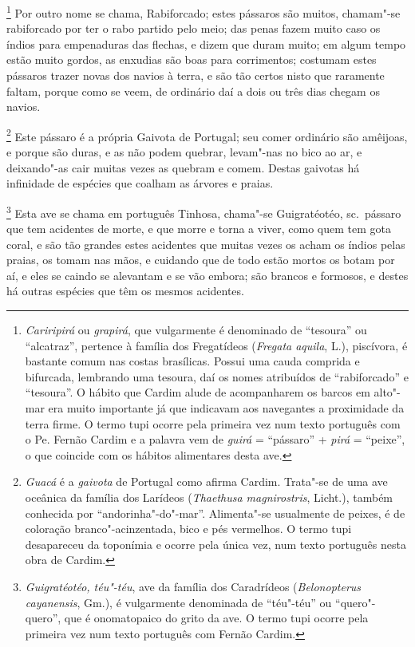 \begin{linenumbers}
\footnote{ \textit{Cariripirá} ou \textit{grapirá}, 
que vulgarmente é denominado de ``tesoura'' ou ``alcatraz'', pertence à
família dos Fregatídeos (\textit{Fregata aquila}, L.), piscívora, é
bastante comum nas costas brasílicas. Possui uma cauda comprida e
bifurcada, lembrando uma tesoura, daí os nomes atribuídos de
``rabiforcado'' e ``tesoura''. O hábito que Cardim alude de acompanharem os
barcos em alto"-mar era muito importante já que indicavam aos navegantes
a proximidade da terra firme. O termo tupi ocorre pela primeira vez num
texto português com o Pe. Fernão Cardim e a palavra vem de
\textit{guirá} = ``pássaro'' + \textit{pirá} = ``peixe'', o que coincide
com os hábitos alimentares desta ave.} Por outro nome se
chama, Rabiforcado; estes pássaros são muitos, chamam"-se rabiforcado
por ter o rabo partido pelo meio; das penas fazem muito caso os índios
para empenaduras das flechas, e dizem que duram muito; em algum tempo
estão muito gordos, as enxudias são boas para corrimentos; costumam
estes pássaros trazer novas dos navios à terra, e são tão certos nisto
que raramente faltam, porque como se veem, de ordinário daí a dois ou
três dias chegam os navios.

\footnote{ \textit{Guacá} é a \textit{gaivota} de
Portugal como afirma Cardim. Trata"-se de uma ave oceânica da família
dos Larídeos (\textit{Thaethusa magnirostris}, Licht.), também
conhecida por ``andorinha"-do"-mar''. Alimenta"-se usualmente de peixes, é
de coloração branco"-acinzentada, bico e pés vermelhos. O termo tupi
desapareceu da toponímia e ocorre pela única vez, num texto português
nesta obra de Cardim.} Este pássaro é a própria Gaivota de
Portugal; seu comer ordinário são amêijoas, e porque são duras, e as
não podem quebrar, levam"-nas no bico ao ar, e deixando"-as cair muitas
vezes as quebram e comem. Destas gaivotas há infinidade de espécies que
coalham as árvores e praias.

\footnote{ \textit{Guigratéotéo, téu"-téu}, ave
da família dos Caradrídeos (\textit{Belonopterus cayanensis}, Gm.), é
vulgarmente denominada de ``téu"-téu'' ou ``quero"-quero'', que é
onomatopaico do grito da ave. O termo tupi ocorre pela primeira vez num
texto português com Fernão Cardim.} Esta ave se chama em
português Tinhosa, chama"-se Guigratéotéo, sc.~pássaro que tem
acidentes de morte, e que morre e torna a viver, como quem tem gota
coral, e são tão grandes estes acidentes que muitas vezes os acham os
índios pelas praias, os tomam nas mãos, e cuidando que de todo estão
mortos os botam por aí, e eles se caindo se alevantam e se vão embora;
são brancos e formosos, e destes há outras espécies que têm os mesmos acidentes.


\end{linenumbers}
